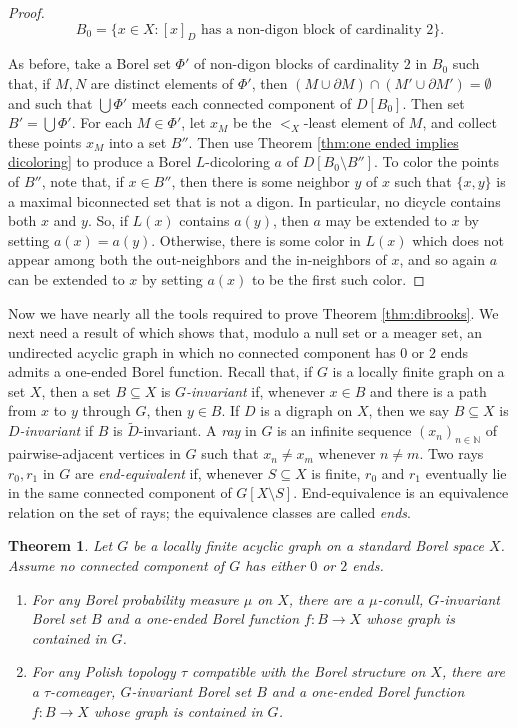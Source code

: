 \documentclass[psamsfonts]{amsart}
\newtheorem{thm}{Theorem}[section]
\theoremstyle{definition}
\newcommand{\N}{\mathbb N}
\theoremstyle{remark}
\numberwithin{equation}{section}
\begin{document}
\begin{proof}
    $$B_0 = \{x \in X : [x]_D \text{ has a non-digon block of cardinality $2$} \}.$$
    
    As before, take a Borel set $\Phi'$ of non-digon blocks of cardinality $2$ in $B_0$ such that, if $M, N$ are distinct elements of $\Phi'$, then $(M \cup \partial M) \cap (M' \cup \partial M') = \emptyset$ and such that $\bigcup \Phi'$ meets each connected component of $D[B_0]$. Then set $B' = \bigcup \Phi'$. For each $M \in \Phi'$, let $x_M$ be the $<_X$-least element of $M$, and collect these points $x_M$ into a set $B''$. Then use Theorem \ref{thm:one ended implies dicoloring} to produce a Borel $L$-dicoloring $a$ of $D[B_0 \setminus B'']$. To color the points of $B''$, note that, if $x \in B''$, then there is some neighbor $y$ of $x$ such that $\{x, y\}$ is a maximal biconnected set that is not a digon. In particular, no dicycle contains both $x$ and $y$. So, if $L(x)$ contains $a(y)$, then $a$ may be extended to $x$ by setting $a(x) = a(y)$. Otherwise, there is some color in $L(x)$ which does not appear among both the out-neighbors and the in-neighbors of $x$, and so again $a$ can be extended to $x$ by setting $a(x)$ to be the first such color.
\end{proof}

Now we have nearly all the tools required to prove Theorem \ref{thm:dibrooks}. We next need a result of \cite{cmt2016} which shows that, modulo a null set or a meager set, an undirected acyclic graph in which no connected component has $0$ or $2$ ends admits a one-ended Borel function. Recall that, if $G$ is a locally finite graph on a set $X$, then a set $B \subseteq X$ is {\it $G$-invariant} if, whenever $x \in B$ and there is a path from $x$ to $y$ through $G$, then $y \in B$. If $D$ is a digraph on $X$, then we say $B \subseteq X$ is {\it $D$-invariant} if $B$ is $\tilde{D}$-invariant. A {\it ray} in $G$ is an infinite sequence $(x_n)_{n \in \N}$ of pairwise-adjacent vertices in $G$ such that $x_n \neq x_m$ whenever $n \neq m$. Two rays $r_0, r_1$ in $G$ are {\it end-equivalent} if, whenever $S \subseteq X$ is finite, $r_0$ and $r_1$ eventually lie in the same connected component of $G[X \setminus S]$. End-equivalence is an equivalence relation on the set of rays; the equivalence classes are called {\it ends}.

\begin{thm}
    \cite[Theorem~1.5]{cmt2016} 
    \label{thm:one ended exists mod small}
    Let $G$ be a locally finite acyclic graph on a standard Borel space $X$. Assume no connected component of $G$ has either $0$ or $2$ ends.
    \begin{enumerate}
        \item For any Borel probability measure $\mu$ on $X$, there are a $\mu$-conull, $G$-invariant Borel set $B$ and a one-ended Borel function $f : B \rightarrow X$ whose graph is contained in $G$.
        \item For any Polish topology $\tau$ compatible with the Borel structure on $X$, there are a $\tau$-comeager, $G$-invariant Borel set $B$ and a one-ended Borel function $f : B \rightarrow X$ whose graph is contained in $G$.
    \end{enumerate}
\end{thm}
\end{document}
